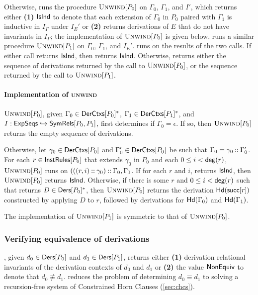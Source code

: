 Otherwise, \chkindaux runs the procedure $\textsc{Unwind}[ P_0 ]$ on $\Gamma_0$,
$\Gamma_1$, and $I'$, which returns either \textbf{(1)} $\mathsf{IsInd}$ to
denote that each extension of $\Gamma_0$ in $P_0$ paired with
$\Gamma_1$ is inductive in $I_{\Gamma}$ under $I_E'$ or %
\textbf{(2)} returns derivations of $E$ that do not have invariants in
$I_{\Gamma}$;
%
the implementation of $\textsc{Unwind}[ P_0 ]$ is given below.
%
\chkindaux runs a similar procedure $\textsc{Unwind}[ P_1 ]$ on $\Gamma_0$,
$\Gamma_1$, and $I_E'$.
\chkindaux runs \chooseres on the results of the two calls.
%
If either call returns $\mathsf{IsInd}$, then \chooseres returns $\mathsf{IsInd}$.
%
Otherwise, \chooseres returns either the sequence of derivations
returned by the call to $\textsc{Unwind}[ P_0 ]$, or the sequence returned by
the call to $\textsc{Unwind}[ P_1 ]$.

\paragraph{Implementation of \textsc{unwind}}
%
$\textsc{Unwind}[ P_0 ]$, given $\Gamma_0 \in \mathsf{DerCtxs}[ P_0 ]^{*}$, $\Gamma_1 \in
\mathsf{DerCtxs}[ P_1 ]^{*}$, and $I : \mathsf{ExpSeqs} \hookrightarrow \mathsf{SymRels}[ P_0, P_1 ]$,
first determines if $\Gamma_0 = \epsilon$.
%
If so, then $\textsc{Unwind}[ P_0 ]$ returns the empty sequence of derivations.

Otherwise, let $\gamma_0 \in \mathsf{DerCtxs}[ P_0 ]$ and $\Gamma_0' \in
\mathsf{DerCtxs}[ P_0 ]$ be such that $\Gamma_0 = \gamma_0 \mathbin{::} \Gamma_0'$.
%
For each $r \in \mathsf{InstRules}[  P_0  ]$ that extends $\gamma_0$ in $P_0$
and each $0 \leq i < \mathsf{deg}(r)$, $\textsc{Unwind}[ P_0 ]$ runs \chkindaux on
$(((r, i) \mathbin{::} \gamma_0) \mathbin{::} \Gamma_0, \Gamma_1$.
%
If for each $r$ and $i$, \chkindaux returns $\mathsf{IsInd}$, then
$\textsc{Unwind}[ P_0 ]$ returns $\mathsf{IsInd}$.
%
Otherwise, if there is some $r$ and $0 \leq i < \mathsf{deg}(r)$ such
that \chkindaux returns $D \in \mathsf{Ders}[ P_0 ]^{*}$, then $\textsc{Unwind}[ P_0 ]$
returns the derivation $\mathsf{Hd}(\mathsf{succ}[ r ])$ constructed by
applying $D$ to $r$, followed by derivations for $\mathsf{Hd}(\Gamma_0)$
and $\mathsf{Hd}(\Gamma_1)$.

The implementation of $\textsc{Unwind}[ P_1 ]$ is symmetric to that of
$\textsc{Unwind}[ P_0 ]$.

\subsubsection{Verifying equivalence of derivations}
\label{sec:verify-ders}
%
\verifyders, given $d_0 \in \mathsf{Ders}[  P_0  ]$ and %
$d_1 \in \mathsf{Ders}[  P_1  ]$, returns either \textbf{(1)} derivation
relational invariants of the derivation contexts of $d_0$ and $d_1$
or %
\textbf{(2)} the value $\mathsf{NonEquiv}$ to denote that $d_0 \not\equiv
d_1$.
%
\verifyders reduces the problem of determining $d_0 \equiv d_1$ to
solving a recursion-free system of Constrained Horn Clauses
(\autoref{sec:chcs}).

